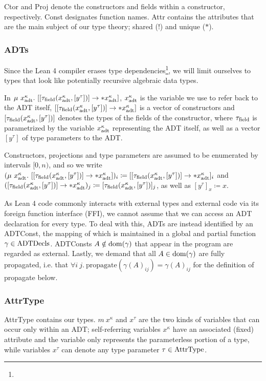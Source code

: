 Ctor and Proj denote the constructors and fields within a constructor, respectively. Const designates function names. Attr contains the attributes that are the main subject of our type theory; shared (!) and unique ($*$). 

\subsubsection{ADTs}
Since the Lean 4 compiler erases type dependencies\footnote{}, we will limit ourselves to types that look like potentially recursive algebraic data types. 

\sloppy In $\mu\ x^\kappa_\adt.\ [[\tau_\field(x^\kappa_\adt, [y^\tau])] \to *x^\kappa_\adt]$, $x^\kappa_{\mathrm{adt}}$ is the variable we use to refer back to the ADT itself, $[[\tau_{\mathrm{field}}(x^\kappa_{\mathrm{adt}}, [y^\tau])] \to *x^\kappa_{\mathrm{adt}}]$ is a vector of constructors and $[\tau_{\mathrm{field}}(x^\kappa_{\mathrm{adt}}, [y^\tau])]$ denotes the types of the fields of the constructor, where $\tau_{\mathrm{field}}$ is parametrized by the variable $x^\kappa_{\mathrm{adt}}$ representing the ADT itself, as well as a vector $[y^\tau]$ of type parameters to the ADT. 

Constructors, projections and type parameters are assumed to be enumerated by intervals $[0, n)$, and so we write $(\mu\ x^\kappa_\adt.\ [[\tau_\field(x^\kappa_\adt, [y^\tau])] \to *x^\kappa_\adt])_i \coloneqq [[\tau_\field(x^\kappa_\adt, [y^\tau])] \to *x^\kappa_\adt]_i$ and $([\tau_{\mathrm{field}}(x^\kappa_{\mathrm{adt}}, [y^\tau])] \to *x^\kappa_{\mathrm{adt}})_j \coloneqq [\tau_{\mathrm{field}}(x^\kappa_{\mathrm{adt}}, [y^\tau])]_j$, as well as $[y^\tau]_x \coloneqq x$. 

As Lean 4 code commonly interacts with external types and external code via its foreign function interface (FFI), we cannot assume that we can access an ADT declaration for every type. To deal with this, ADTs are instead identified by an ADTConst, the mapping of which is maintained in a global and partial function $\gamma \in \mathrm{ADTDecls}$. ADTConsts $A \notin \mathrm{dom}(\gamma)$ that appear in the program are regarded as external. Lastly, we demand that all $A \in \mathrm{dom}(\gamma)$ are fully propagated, i.e. that $\forall i\ j.\ \mathrm{propagate}(\gamma(A)_{ij}) = \gamma(A)_{ij}$ for the definition of propagate below.

\subsubsection{AttrType}
AttrType contains our types. $m\ x^\kappa$ and $x^\tau$ are the two kinds of variables that can occur only within an ADT; self-referring variables $x^\kappa$ have an associated (fixed) attribute and the variable only represents the parameterless portion of a type, while variables $x^\tau$ can denote any type parameter $\tau \in \mathrm{AttrType}$. 

